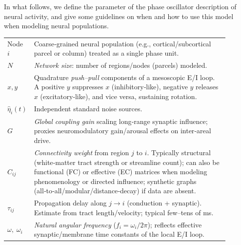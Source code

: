 \documentclass[12pt]{article}
\numberwithin{equation}{section}
\begin{document}
  

In what follows, we define the parameter of the phase oscillator description of neural activity, and give some guidelines on when and how to use this model when modeling neural populations.

\begin{tcolorbox}[
  colback=gray!5,
  colframe=slate,
  colbacktitle=softblue!25,
  coltitle=softblue!60!black,
  fonttitle=\bfseries\small,
 title={\small  \textit{Coupled Undamped Harmonic Oscillators (Eq.~\ref{eq:kuramoto_connectome})}\\ Whole-brain Simulations Parameters \& Physiological Meaning },
  boxrule=0.4pt,
  enhanced, sharp corners,
  left=4pt,right=4pt,top=3pt,bottom=3pt,
  boxsep=2pt,
  before skip=6pt, after skip=6pt
]
\scriptsize
\begin{tabular}{@{}l p{0.9\linewidth}@{}}
Node $i$ & Coarse‑grained neural population (e.g., cortical/subcortical parcel or column) treated as a single phase unit.\\
\textbf{$N$} & \emph{Network size}: number of regions/nodes (parcels) modeled.\\
\textbf{$x,y$} & Quadrature \emph{push–pull} components of a mesoscopic E/I loop. A positive $y$ suppresses $x$ (inhibitory‑like), negative $y$ releases $x$ (excitatory‑like), and vice versa, sustaining rotation.\\
\textbf{$\hat\eta_i(t)$} & Independent standard noise sources.\\
\textbf{$G$} & \emph{Global coupling gain} scaling long‑range synaptic influence; proxies neuromodulatory gain/arousal effects on inter‑areal drive.\\
\textbf{$C_{ij}$} & \emph{Connectivity weight} from region $j$ to $i$. Typically structural (white‑matter tract strength or streamline count); can also be functional (FC) or effective (EC) matrices when modeling phenomenology or directed influence; synthetic graphs (all‑to‑all/modular/distance‑decay) if data are absent.\\
\textbf{$\tau_{ij}$} & Propagation delay along $j\!\to i$ (conduction + synaptic). Estimate from tract length/velocity; typical few–tens of ms.\\
\textbf{$\omega,\;\omega_i$} & \emph{Natural angular frequency} ($f_i=\omega_i/2\pi$); reflects effective synaptic/membrane time constants of the local E/I loop.\\

\end{tabular}
\end{tcolorbox}
\end{document}
